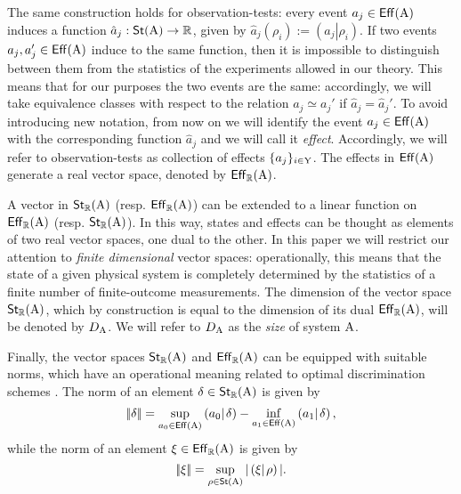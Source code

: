 \documentclass[12pt,aps,pra,showpacs,groupedaddress]{revtex4-1}
\def\Cntset{{\mathsf{Eff}}}
\def\Stset{{\mathsf{St}}}
\def\SC#1#2{\left(#1\right|\left.\!#2\right)}  \def\Tr{{\rm Tr}}
\def\Reals{{\mathbb R}}
\begin{document}
The same construction holds for observation-tests: every event $a_j \in \Cntset(\rA)$ induces a
function $\hat a_j : \Stset (\rA) \to \Reals$, given by $\hat a_j (\rho_i) := \SC {a_j} {\rho_i}$.
If two events $a_j, a_j' \in \Cntset (\rA)$ induce to the same function, then it is impossible to
distinguish between them from the statistics of the experiments allowed in our theory.  This means
that for our purposes the two events are the same: accordingly, we will take equivalence classes
with respect to the relation $a_j \simeq a_j'$ if $\hat a_j = \hat a_j'$. To avoid introducing new
notation, from now on we will identify the event $a_j \in \Cntset (\rA)$ with the corresponding
function $\hat a_j$ and we will call it \emph{effect}.  Accordingly, we will refer to
observation-tests as collection of effects $\{a_j\}_{i \in {\rm Y}}$.  The effects in $\Cntset (\rA)$
generate a real vector space, denoted by $\Cntset_\Reals (\rA)$.

A vector in $\Stset_\Reals (\rA)$ (resp.  $\Cntset_\Reals (\rA)$) can be extended to a linear
function on $\Cntset_\Reals (\rA)$ (resp. $\Stset_\Reals (\rA)$).  In this way, states and effects
can be thought as elements of two real vector spaces, one dual to the other.  In this paper we will
restrict our attention to \emph{finite dimensional} vector spaces: operationally, this means that the state of a given physical system is completely determined by the statistics of a finite number of finite-outcome measurements.  The dimension of the vector space
$\Stset_\Reals (\rA)$, which by construction is equal to the dimension of its dual
$\Cntset_\Reals(\rA)$, will be denoted by $D_{\rm A}$.  We will refer to $D_{\rm A}$ as the \emph{size} of
system ${\rm A}$.
 
 
 
 
Finally, the vector spaces $\Stset_\Reals (\rA)$ and $\Cntset_\Reals (\rA)$ can be equipped with
suitable norms, which have an operational meaning related to optimal discrimination schemes
\cite{purification}.  The norm of an element $\delta \in \Stset_\Reals (\rA)$ is given by
\cite{purification}
\begin{equation*}
|\!| \delta   |\!|  = \sup_{a_0 \in \Cntset(\rA)} \SC {a_0} \delta  - \inf_{a_1 \in \Cntset (\rA)}  \SC {a_1} \delta,
\end{equation*} 
while the norm of an element $\xi \in \Cntset_\Reals (\rA)$ is given by 
\begin{equation*}
|\!| \xi   |\!|  = \sup_{\rho \in \Stset(\rA)}  |  \SC \xi \rho  | .
\end{equation*} 
\end{document}
